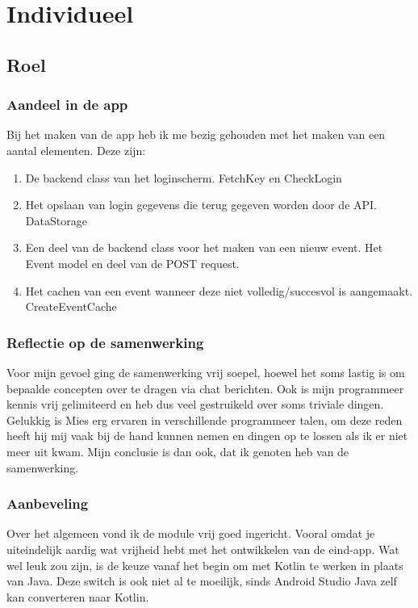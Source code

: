 \documentclass[dutch]{report}
\begin{document}
	\newpage
	\section{Individueel}
	
	\subsection{Roel}

	\subsubsection{Aandeel in de app}
	Bij het maken van de app heb ik me bezig gehouden met het maken van een aantal elementen. Deze zijn:
	\begin{enumerate}
		\item De backend class van het loginscherm.
		\subitem FetchKey en CheckLogin
		\item Het opslaan van login gegevens die terug gegeven worden door de API.
		\subitem DataStorage
		\item Een deel van de backend class voor het maken van een nieuw event.
		\subitem Het Event model en deel van de POST request.
		\item Het cachen van een event wanneer deze niet volledig/succesvol is aangemaakt.
		\subitem CreateEventCache
	\end{enumerate}
	\subsubsection{Reflectie op de samenwerking}
	Voor mijn gevoel ging de samenwerking vrij soepel, hoewel het soms lastig is om bepaalde concepten over te dragen via chat berichten. Ook is mijn programmeer kennis vrij gelimiteerd en heb dus veel gestruikeld over soms triviale dingen. Gelukkig is Mies erg ervaren in verschillende programmeer talen, om deze reden heeft hij mij vaak bij de hand kunnen nemen en dingen op te lossen als ik er niet meer uit kwam. Mijn conclusie is dan ook, dat ik genoten heb van de samenwerking.
	\subsubsection{Aanbeveling}
	Over het algemeen vond ik de module vrij goed ingericht. Vooral omdat je uiteindelijk aardig wat vrijheid hebt met het ontwikkelen van de eind-app. Wat wel leuk zou zijn, is de keuze vanaf het begin om met Kotlin te werken in plaats van Java. Deze switch is ook niet al te moeilijk, sinds Android Studio Java zelf kan converteren naar Kotlin.
	
\end{document}
